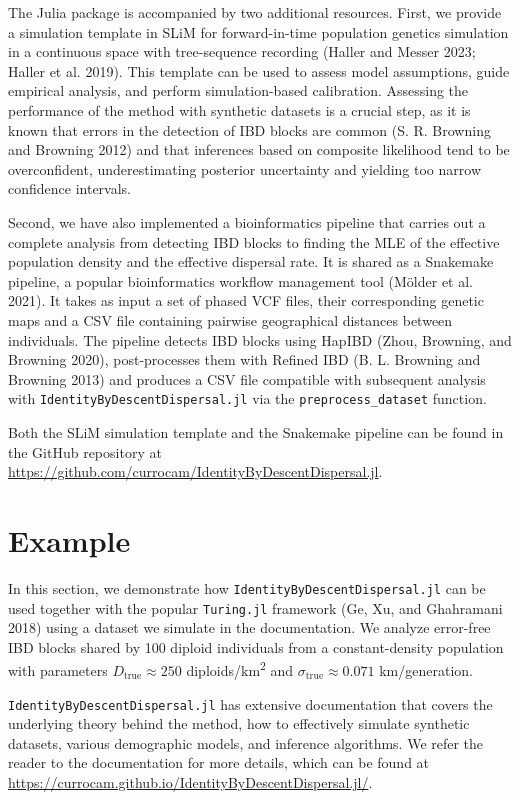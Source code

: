 \documentclass[
]{article}
\begin{document}
The Julia package is accompanied by two additional resources. First, we
provide a simulation template in SLiM for forward-in-time population
genetics simulation in a continuous space with tree-sequence recording
(Haller and Messer 2023; Haller et al. 2019). This template can be used
to assess model assumptions, guide empirical analysis, and perform
simulation-based calibration. Assessing the performance of the method
with synthetic datasets is a crucial step, as it is known that errors in
the detection of IBD blocks are common (S. R. Browning and Browning
2012) and that inferences based on composite likelihood tend to be
overconfident, underestimating posterior uncertainty and yielding too
narrow confidence intervals.

Second, we have also implemented a bioinformatics pipeline that carries
out a complete analysis from detecting IBD blocks to finding the MLE of
the effective population density and the effective dispersal rate. It is
shared as a Snakemake pipeline, a popular bioinformatics workflow
management tool (Mölder et al. 2021). It takes as input a set of phased
VCF files, their corresponding genetic maps and a CSV file containing
pairwise geographical distances between individuals. The pipeline
detects IBD blocks using HapIBD (Zhou, Browning, and Browning 2020),
post-processes them with Refined IBD (B. L. Browning and Browning 2013)
and produces a CSV file compatible with subsequent analysis with
\texttt{IdentityByDescentDispersal.jl} via the
\texttt{preprocess\_dataset} function.

Both the SLiM simulation template and the Snakemake pipeline can be
found in the GitHub repository at
\url{https://github.com/currocam/IdentityByDescentDispersal.jl}.

\section{Example}\label{sec-example}

In this section, we demonstrate how
\texttt{IdentityByDescentDispersal.jl} can be used together with the
popular \texttt{Turing.jl} framework (Ge, Xu, and Ghahramani 2018) using
a dataset we simulate in the documentation. We analyze error-free IBD
blocks shared by 100 diploid individuals from a constant-density
population with parameters \(D_{\text{true}}\approx 250\)
diploids/km\textsuperscript{2} and \(\sigma_{\text{true}}\approx 0.071\)
km/generation.

\texttt{IdentityByDescentDispersal.jl} has extensive documentation that
covers the underlying theory behind the method, how to effectively
simulate synthetic datasets, various demographic models, and inference
algorithms. We refer the reader to the documentation for more details,
which can be found at
\href{https://currocam.github.io/IdentityByDescentDispersal.jl/dev/}{https://currocam.github.io/IdentityByDescentDispersal.jl/}.
\end{document}
